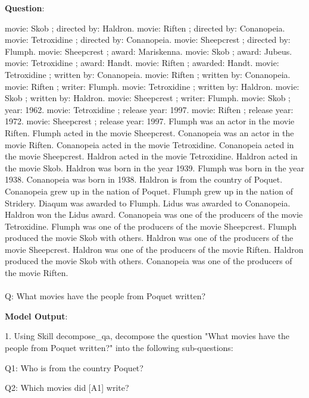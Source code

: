\documentclass{article} \usepackage{arxiv}
\begin{document}
\begin{tcolorbox}[title = {CommaQA-E}, colback = Apricot!25!white, colframe = BrickRed!75!black] 
\textbf{Question}: 

\quad

movie: Skob ; directed by: Haldron. movie: Riften ; directed by: Conanopeia. movie: Tetroxidine ; directed by: Conanopeia. movie: Sheepcrest ; directed by: Flumph. movie: Sheepcrest ; award: Mariskenna. movie: Skob ; award: Jubeus. movie: Tetroxidine ; award: Handt. movie: Riften ; awarded: Handt. movie: Tetroxidine ; written by: Conanopeia. movie: Riften ; written by: Conanopeia. movie: Riften ; writer: Flumph. movie: Tetroxidine ; written by: Haldron. movie: Skob ; written by: Haldron. movie: Sheepcrest ; writer: Flumph. movie: Skob ; year: 1962. movie: Tetroxidine ; release year: 1997. movie: Riften ; release year: 1972. movie: Sheepcrest ; release year: 1997. Flumph was an actor in the movie Riften. Flumph acted in the movie Sheepcrest. Conanopeia was an actor in the movie Riften. Conanopeia acted in the movie Tetroxidine. Conanopeia acted in the movie Sheepcrest. Haldron acted in the movie Tetroxidine. Haldron acted in the movie Skob. Haldron was born in the year 1939. Flumph was born in the year 1938. Conanopeia was born in 1938. Haldron is from the country of Poquet. Conanopeia grew up in the nation of Poquet. Flumph grew up in the nation of Stridery. Diaqum was awarded to Flumph. Lidus was awarded to Conanopeia. Haldron won the Lidus award. Conanopeia was one of the producers of the movie Tetroxidine. Flumph was one of the producers of the movie Sheepcrest. Flumph produced the movie Skob with others. Haldron was one of the producers of the movie Sheepcrest. Haldron was one of the producers of the movie Riften. Haldron produced the movie Skob with others. Conanopeia was one of the producers of the movie Riften. \\ \\

Q: What movies have the people from Poquet written? 


\tcblower
\textbf{Model Output}:

\quad

1. Using Skill decompose\_qa, decompose the question "What movies have the people from Poquet written?" into the following sub-questions: 

\quad

  \qquad  Q1: Who is from the country Poquet? 
  
   \qquad Q2: Which movies did [A1] write? 


\end{tcolorbox}
\end{document}
